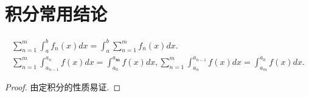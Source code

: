 \documentclass[../../main.tex]{subfiles}
\begin{document}
\section{积分常用结论}

\begin{theorem}[基本结论]\label{theorem:积分与求和基本结论}
\begin{gather*}
\sum\limits_{n=1}^m{\int_a^b{f_n\left( x \right) dx=}}\int_a^b{\sum\limits_{n=1}^m{f_n\left( x \right) dx}}.
\\
\sum\limits_{n=1}^m{\int_{a_{n-1}}^{a_n}{f\left( x \right) dx=}}\int_{a_0}^{a_{\boldsymbol{m}}}{f\left( x \right) dx},\sum\limits_{n=1}^m{\int_{a_n}^{a_{n-1}}{f\left( x \right) dx}}=\int_{a_m}^{a_0}{f\left( x \right) dx}.
\end{gather*}
\end{theorem}
\begin{proof}
由定积分的性质易证.
\end{proof}
\end{document}
